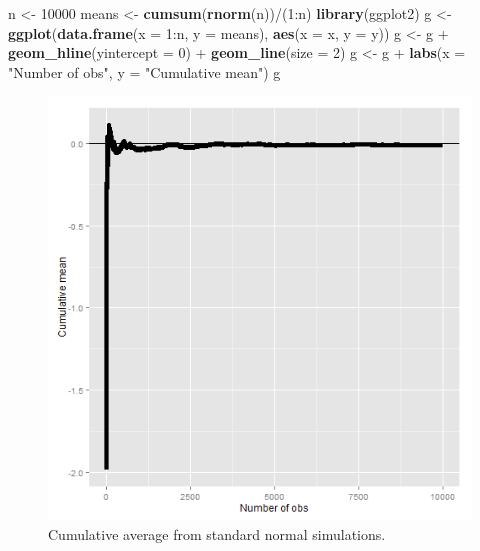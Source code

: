 \documentclass[]{article}
\newenvironment{Shaded}{\begin{snugshade}}{\end{snugshade}}
\newcommand{\KeywordTok}[1]{\textcolor[rgb]{0.13,0.29,0.53}{\textbf{{#1}}}}
\newcommand{\DataTypeTok}[1]{\textcolor[rgb]{0.13,0.29,0.53}{{#1}}}
\newcommand{\DecValTok}[1]{\textcolor[rgb]{0.00,0.00,0.81}{{#1}}}
\newcommand{\StringTok}[1]{\textcolor[rgb]{0.31,0.60,0.02}{{#1}}}
\newcommand{\NormalTok}[1]{{#1}}
\begin{document}
\begin{Shaded}
\begin{Highlighting}[]
\NormalTok{n <-}\StringTok{ }\DecValTok{10000}
\NormalTok{means <-}\StringTok{ }\KeywordTok{cumsum}\NormalTok{(}\KeywordTok{rnorm}\NormalTok{(n))/(}\DecValTok{1}\NormalTok{:n)}
\KeywordTok{library}\NormalTok{(ggplot2)}
\NormalTok{g <-}\StringTok{ }\KeywordTok{ggplot}\NormalTok{(}\KeywordTok{data.frame}\NormalTok{(}\DataTypeTok{x =} \DecValTok{1}\NormalTok{:n, }\DataTypeTok{y =} \NormalTok{means), }\KeywordTok{aes}\NormalTok{(}\DataTypeTok{x =} \NormalTok{x, }\DataTypeTok{y =} \NormalTok{y))}
\NormalTok{g <-}\StringTok{ }\NormalTok{g +}\StringTok{ }\KeywordTok{geom_hline}\NormalTok{(}\DataTypeTok{yintercept =} \DecValTok{0}\NormalTok{) +}\StringTok{ }\KeywordTok{geom_line}\NormalTok{(}\DataTypeTok{size =} \DecValTok{2}\NormalTok{)}
\NormalTok{g <-}\StringTok{ }\NormalTok{g +}\StringTok{ }\KeywordTok{labs}\NormalTok{(}\DataTypeTok{x =} \StringTok{"Number of obs"}\NormalTok{, }\DataTypeTok{y =} \StringTok{"Cumulative mean"}\NormalTok{)}
\NormalTok{g}
\end{Highlighting}
\end{Shaded}

\begin{figure}[htbp]
\centering
\includegraphics{LeanPub/images/normalLLN-1.png}
\caption{Cumulative average from standard normal simulations.}
\end{figure}
\end{document}
